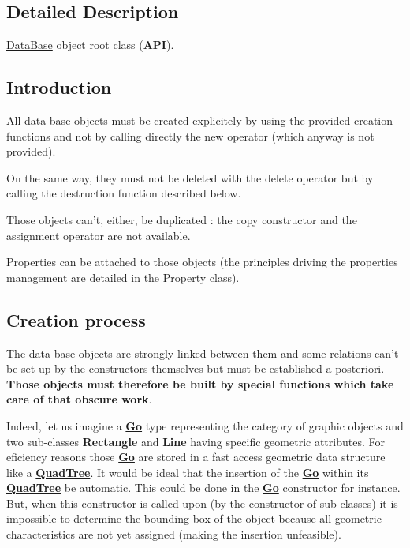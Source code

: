 \subsection{Detailed Description}
\hyperlink{classHurricane_1_1DataBase}{Data\-Base} object root class ({\bfseries A\-P\-I}). 

\hypertarget{classHurricane_1_1DBo_sDBoIntro}{}\subsection{Introduction}\label{classHurricane_1_1DBo_sDBoIntro}
All data base objects must be created explicitely by using the provided creation functions and not by calling directly the new operator (which anyway is not provided).

On the same way, they must not be deleted with the delete operator but by calling the destruction function described below.

Those objects can't, either, be duplicated \-: the copy constructor and the assignment operator are not available.

Properties can be attached to those objects (the principles driving the properties management are detailed in the \hyperlink{classHurricane_1_1Property}{Property} class).\hypertarget{classHurricane_1_1DBo_sDBoCreation}{}\subsection{Creation process}\label{classHurricane_1_1DBo_sDBoCreation}
The data base objects are strongly linked between them and some relations can't be set-\/up by the constructors themselves but must be established a posteriori. {\bfseries Those objects must therefore be built by special functions which take care of that obscure work}.

Indeed, let us imagine a {\bfseries \hyperlink{classHurricane_1_1Go}{Go}} type representing the category of graphic objects and two sub-\/classes {\bfseries Rectangle} and {\bfseries Line} having specific geometric attributes. For eficiency reasons those {\bfseries \hyperlink{classHurricane_1_1Go}{Go}} are stored in a fast access geometric data structure like a {\bfseries \hyperlink{classHurricane_1_1QuadTree}{Quad\-Tree}}. It would be ideal that the insertion of the {\bfseries \hyperlink{classHurricane_1_1Go}{Go}} within its {\bfseries \hyperlink{classHurricane_1_1QuadTree}{Quad\-Tree}} be automatic. This could be done in the {\bfseries \hyperlink{classHurricane_1_1Go}{Go}} constructor for instance. But, when this constructor is called upon (by the constructor of sub-\/classes) it is impossible to determine the bounding box of the object because all geometric characteristics are not yet assigned (making the insertion unfeasible).

